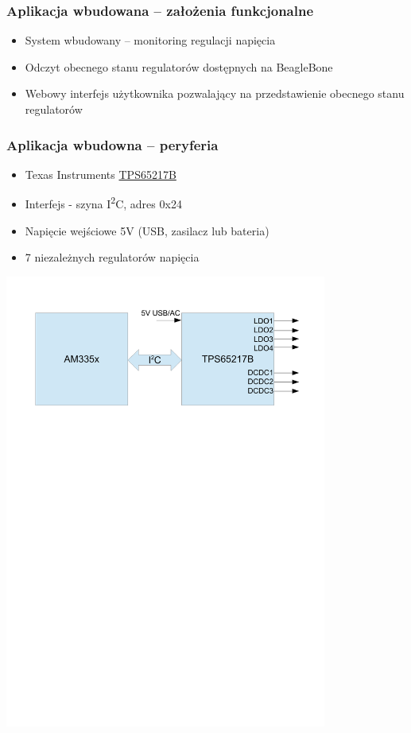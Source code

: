 \documentclass[dvipsnames,table]{beamer}
\begin{document}
\begin{frame}
\frametitle{Aplikacja wbudowana -- założenia funkcjonalne}
\begin{itemize}
	\item System wbudowany -- monitoring regulacji napięcia
	\item Odczyt obecnego stanu regulatorów dostępnych na BeagleBone
	\item Webowy interfejs użytkownika pozwalający na przedstawienie obecnego stanu regulatorów
\end{itemize}
\end{frame}


\begin{frame}
\frametitle{Aplikacja wbudowna -- peryferia}
\begin{itemize}
	\item Texas Instruments \href{http://www.ti.com/product/tps65217b}{TPS65217B}
	\item Interfejs - szyna I\textsuperscript{2}C, adres 0x24
	\item Napięcie wejściowe 5V (USB, zasilacz lub bateria)
	\item 7 niezależnych regulatorów napięcia
\end{itemize}
\includegraphics[width=300pt]{img_am335x-tps65217.pdf}
\end{frame}
\end{document}
